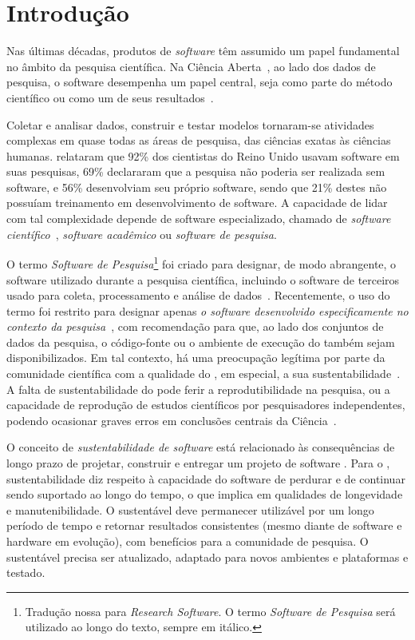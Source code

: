 \section{Introdução}
\label{section:introduction}

Nas últimas décadas, produtos de \textit{software} têm assumido um papel fundamental no âmbito da pesquisa científica.
%
Na Ciência Aberta~\cite{unesco:2021}, ao lado dos dados de pesquisa, o software desempenha um papel central, seja como parte do método científico ou como um de seus resultados~\cite{training:handbook}.

Coletar e analisar dados, construir e testar modelos tornaram-se atividades complexas em quase todas as áreas de pesquisa, das ciências exatas às ciências humanas.
%
\cite{hettrick2014uk} relataram que 92\% dos cientistas do Reino Unido usavam software em suas pesquisas, 69\% declararam que a pesquisa não poderia ser realizada sem software, e 56\% desenvolviam seu próprio software, sendo que 21\% destes não possuíam treinamento em desenvolvimento de software.
%
A capacidade de lidar com tal complexidade depende de software especializado, chamado de \textit{software científico}~\cite{hannay:2009}, \textit{software acadêmico} \cite{howison2011scientific} ou \textit{software de pesquisa}.

O termo \textit{Software de Pesquisa}\footnote{Tradução nossa para \textit{Research Software}. O termo \textit{Software de Pesquisa} será utilizado ao longo do texto, sempre em itálico.} foi criado para designar, de modo abrangente, o software utilizado durante a pesquisa científica, incluindo o software de terceiros usado para coleta, processamento e análise de dados~\cite{allen_et_al:DM:2017:7146}.
Recentemente, o uso do termo foi restrito para designar apenas \textit{o software desenvolvido especificamente no contexto da pesquisa}~\cite{nieuwpoort_defining_2023},
com recomendação para que, ao lado dos conjuntos de dados da pesquisa, o código-fonte ou o ambiente de execução do \RSw também sejam disponibilizados.
%
Em tal contexto, há uma preocupação legítima por parte da comunidade científica com a qualidade do \RSw, em especial, a sua sustentabilidade~\cite{carver:rs:2022}. 
A falta de sustentabilidade do \RSw pode ferir a reprodutibilidade na pesquisa, ou a capacidade de reprodução de estudos científicos por pesquisadores independentes, podendo ocasionar graves erros em conclusões centrais da Ciência~\cite{merali2010computational}.

O conceito de \textit{sustentabilidade de software} está relacionado às consequências de longo prazo de projetar, construir e entregar um projeto de software \cite{venters_2014,venters_software_2021}.
Para o \RS, sustentabilidade diz respeito à capacidade do software de perdurar e de continuar sendo suportado ao longo do tempo, o que implica em qualidades de longevidade e manutenibilidade.
O \RSw sustentável deve permanecer utilizável por um longo período de tempo e retornar resultados consistentes (mesmo diante de software e hardware em evolução), com benefícios para a comunidade de pesquisa.
O \RSw sustentável precisa ser atualizado, adaptado para novos ambientes e plataformas e testado.

